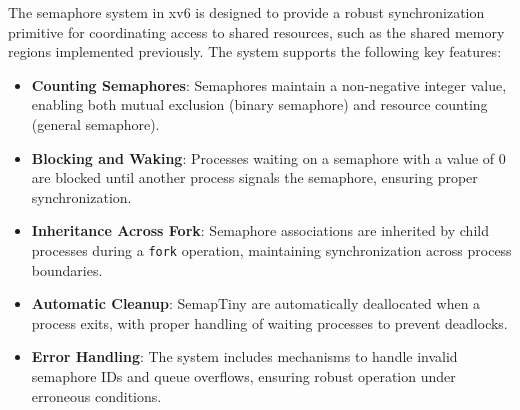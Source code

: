 \documentclass[12pt]{article}
\begin{document}
The semaphore system in xv6 is designed to provide a robust synchronization primitive for coordinating access to shared resources, such as the shared memory regions implemented previously. The system supports the following key features:
\begin{itemize}
  \item \textbf{Counting Semaphores}: Semaphores maintain a non-negative integer value, enabling both mutual exclusion (binary semaphore) and resource counting (general semaphore).
  \item \textbf{Blocking and Waking}: Processes waiting on a semaphore with a value of 0 are blocked until another process signals the semaphore, ensuring proper synchronization.
  \item \textbf{Inheritance Across Fork}: Semaphore associations are inherited by child processes during a \texttt{fork} operation, maintaining synchronization across process boundaries.
  \item \textbf{Automatic Cleanup}: SemapTiny are automatically deallocated when a process exits, with proper handling of waiting processes to prevent deadlocks.
  \item \textbf{Error Handling}: The system includes mechanisms to handle invalid semaphore IDs and queue overflows, ensuring robust operation under erroneous conditions.
\end{itemize}
\end{document}
